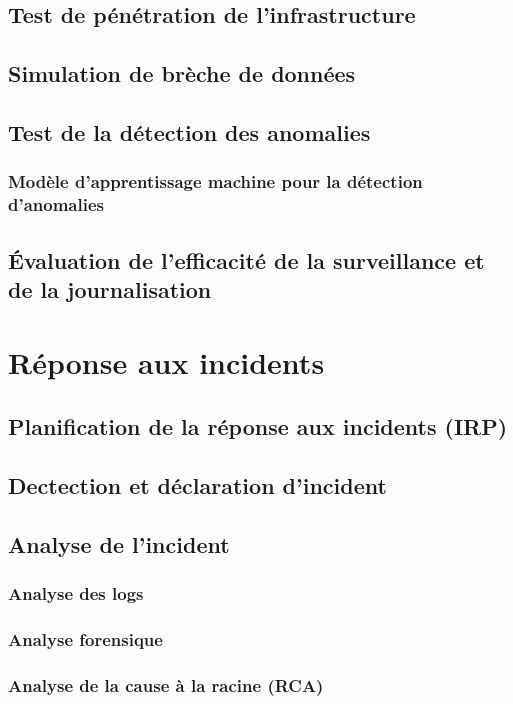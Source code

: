 \documentclass[conference]{IEEEtran}
\begin{document}
\subsection{Test de pénétration de l'infrastructure}

\subsection{Simulation de brèche de données}

\subsection{Test de la détection des anomalies}
\subsubsection{Modèle d'apprentissage machine pour la détection d'anomalies}
\subsection{Évaluation de l'efficacité de la surveillance et de la journalisation}

\section{Réponse aux incidents}

\subsection{Planification de la réponse aux incidents (IRP)}

\subsection{Dectection et déclaration d'incident}
\subsection{Analyse de l'incident}
\subsubsection{Analyse des logs}
\subsubsection{Analyse forensique}
\subsubsection{Analyse de la cause à la racine (RCA)}
\end{document}
